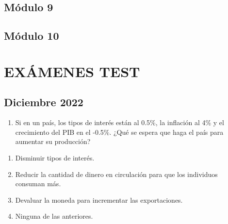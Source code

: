 \documentclass[
  letterpaper,
  DIV=11,
  numbers=noendperiod]{scrreprt}
\providecommand{\tightlist}{%
  \setlength{\itemsep}{0pt}\setlength{\parskip}{0pt}}\usepackage{longtable,booktabs,array}
\begin{document}

\hypertarget{muxf3dulo-9}{%
\chapter*{Módulo 9}\label{muxf3dulo-9}}


\hypertarget{muxf3dulo-10}{%
\chapter*{Módulo 10}\label{muxf3dulo-10}}


\part{EXÁMENES TEST}

\hypertarget{diciembre-2022}{%
\chapter*{Diciembre 2022}\label{diciembre-2022}}


\begin{enumerate}
\def\labelenumi{\arabic{enumi}.}
\tightlist
\item
  Si en un país, los tipos de interés están al 0.5\%, la inflación al
  4\% y el crecimiento del PIB en el -0.5\%. ¿Qué se espera que haga el
  país para aumentar su producción?
\end{enumerate}

\begin{enumerate}
\def\labelenumi{\alph{enumi})}
\item
  Disminuir tipos de interés.
\item
  Reducir la cantidad de dinero en circulación para que los individuos
  consuman más.
\item
  Devaluar la moneda para incrementar las exportaciones.
\item
  Ninguna de las anteriores.
\end{enumerate}
\end{document}
